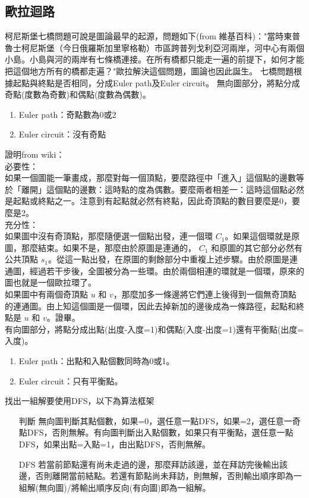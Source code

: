 \subsection{歐拉迴路}
柯尼斯堡七橋問題可說是圖論最早的起源，問題如下(from 維基百科)："當時東普魯士柯尼斯堡（今日俄羅斯加里寧格勒）市區跨普列戈利亞河兩岸，河中心有兩個小島。小島與河的兩岸有七條橋連接。在所有橋都只能走一遍的前提下，如何才能把這個地方所有的橋都走遍？"歐拉解決這個問題，圖論也因此誕生。
七橋問題根據起點與終點是否相同，分成Euler path及Euler circuit。
無向圖部分，將點分成奇點(度數為奇數)和偶點(度數為偶數)。
\begin{enumerate}
\item Euler path：奇點數為0或2
\item Euler circuit：沒有奇點
\end{enumerate}
證明from wiki：\\
必要性：\\如果一個圖能一筆畫成，那麼對每一個頂點，要麼路徑中「進入」這個點的邊數等於「離開」這個點的邊數：這時點的度為偶數。要麼兩者相差一：這時這個點必然是起點或終點之一。注意到有起點就必然有終點，因此奇頂點的數目要麼是0，要麼是2。\\
充分性：\\如果圖中沒有奇頂點，那麼隨便選一個點出發，連一個環 $C_{1}$。如果這個環就是原圖，那麼結束。如果不是，那麼由於原圖是連通的， $ C_{1}$ 和原圖的其它部分必然有公共頂點 $s_{1}$。從這一點出發，在原圖的剩餘部分中重複上述步驟。由於原圖是連通圖，經過若干步後，全圖被分為一些環。由於兩個相連的環就是一個環，原來的圖也就是一個歐拉環了。\\如果圖中有兩個奇頂點 $u$ 和 $v$，那麼加多一條邊將它們連上後得到一個無奇頂點的連通圖。由上知這個圖是一個環，因此去掉新加的邊後成為一條路徑，起點和終點是 $u$ 和 $v$。證畢。\\
有向圖部分，將點分成出點(出度-入度=1)和偶點(入度-出度=1)還有平衡點(出度=入度)。
\begin{enumerate}
\item Euler path：出點和入點個數同時為0或1。
\item Euler circuit：只有平衡點。
\end{enumerate}
找出一組解要使用DFS，以下為算法框架
\begin{enumerate}
\item [判斷] 無向圖判斷其點個數，如果=0，選任意一點DFS，如果=2，選任意一奇點DFS，否則無解。有向圖判斷出入點個數，如果只有平衡點，選任意一點DFS，如果出點=入點=1，由出點DFS，否則無解。
\item [DFS] 若當前節點還有尚未走過的邊，那麼拜訪該邊，並在拜訪完後輸出該邊，否則離開當前結點。若還有節點尚未拜訪，則無解，否則輸出順序即為一組解(無向圖)/將輸出順序反向(有向圖)即為一組解。
\end{enumerate}
